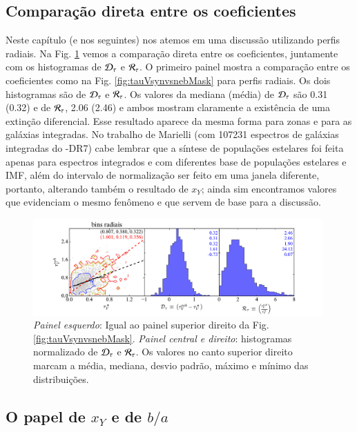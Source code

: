\subsection{Comparação direta entre os coeficientes}
\label{sec:difextin:emp:comparetauV}

Neste capítulo (e nos seguintes) nos atemos em uma discussão utilizando perfis radiais. Na Fig.
\ref{fig:tauVhisto} vemos a comparação direta entre os coeficientes, juntamente com os histogramas
de $\Dtau$ e $\Rtau$. O primeiro painel mostra a comparação entre os coeficientes como na Fig.
\ref{fig:tauVsynvsnebMask} para perfis radiais. Os dois histogramas são de $\Dtau$ e $\Rtau$. Os
valores da mediana (média) de $\Dtau$ são 0.31 (0.32) e de $\Rtau$, 2.06 (2.46) e ambos mostram
claramente a existência de uma extinção diferencial. Esse resultado aparece da mesma forma para
zonas e para as galáxias integradas. No trabalho de Marielli (com 107231 espectros de galáxias
integradas do \SDSS-DR7) cabe lembrar que a síntese de populações estelares foi feita apenas para
espectros integrados e com diferentes base de populações estelares e IMF, além do intervalo de
normalização ser feito em uma janela diferente, portanto, alterando também o resultado de $x_Y$;
ainda sim encontramos valores que evidenciam o mesmo fenômeno e que servem de base para a discussão.

\begin{figure}
	\centering
	\includegraphics[width=0.99\textwidth]{figuras/histoTauVR.pdf}
	\caption[Comparação $\tauVS$ e histogramas de $\Dtau$ e $\Rtau$.]
	{\emph{Painel esquerdo}: Igual ao painel superior direito da Fig. \ref{fig:tauVsynvsnebMask}.
\emph{Painel central e direito}: histogramas normalizado de $\Dtau$ e $\Rtau$. Os valores no canto
superior direito marcam a média, mediana, desvio padrão, máximo e mínimo das distribuições.}
	\label{fig:tauVhisto}
\end{figure}

\subsection{O papel de $x_Y$ e de $b/a$}
\label{sec:difextin:emp:xYcosi}

